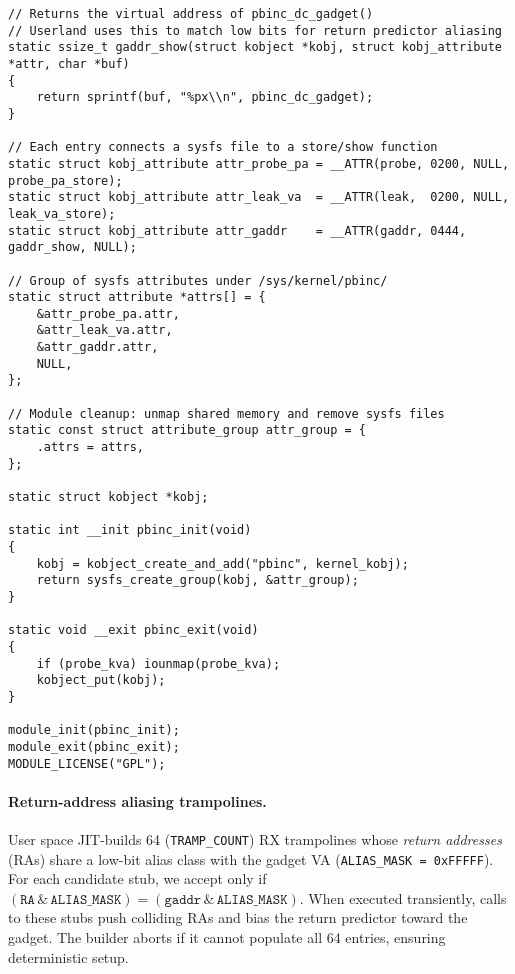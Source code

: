 \documentclass[11pt,a4paper]{article}
\begin{document}
\begin{lstlisting}
// Returns the virtual address of pbinc_dc_gadget()
// Userland uses this to match low bits for return predictor aliasing
static ssize_t gaddr_show(struct kobject *kobj, struct kobj_attribute *attr, char *buf)
{
    return sprintf(buf, "%px\\n", pbinc_dc_gadget);
}

// Each entry connects a sysfs file to a store/show function
static struct kobj_attribute attr_probe_pa = __ATTR(probe, 0200, NULL, probe_pa_store);
static struct kobj_attribute attr_leak_va  = __ATTR(leak,  0200, NULL, leak_va_store);
static struct kobj_attribute attr_gaddr    = __ATTR(gaddr, 0444, gaddr_show, NULL);

// Group of sysfs attributes under /sys/kernel/pbinc/
static struct attribute *attrs[] = {
    &attr_probe_pa.attr,
    &attr_leak_va.attr,
    &attr_gaddr.attr,
    NULL,
};

// Module cleanup: unmap shared memory and remove sysfs files
static const struct attribute_group attr_group = {
    .attrs = attrs,
};

static struct kobject *kobj;

static int __init pbinc_init(void)
{
    kobj = kobject_create_and_add("pbinc", kernel_kobj);
    return sysfs_create_group(kobj, &attr_group);
}

static void __exit pbinc_exit(void)
{
    if (probe_kva) iounmap(probe_kva);
    kobject_put(kobj);
}

module_init(pbinc_init);
module_exit(pbinc_exit);
MODULE_LICENSE("GPL");
\end{lstlisting}

\paragraph{Return-address aliasing trampolines.}
User space JIT-builds 64 (\texttt{TRAMP\_COUNT}) RX trampolines whose \emph{return addresses} (RAs) share a low-bit alias class with the gadget VA (\texttt{ALIAS\_MASK = 0xFFFFF}). For each candidate stub, we accept only if \((\texttt{RA} \,\&\, \texttt{ALIAS\_MASK}) = (\texttt{gaddr} \,\&\, \texttt{ALIAS\_MASK})\). When executed transiently, calls to these stubs push colliding RAs and bias the return predictor toward the gadget. The builder aborts if it cannot populate all 64 entries, ensuring deterministic setup.\cite{wikner2022retbleed,trujillo2023inception,wikner2023phantom}
\end{document}
